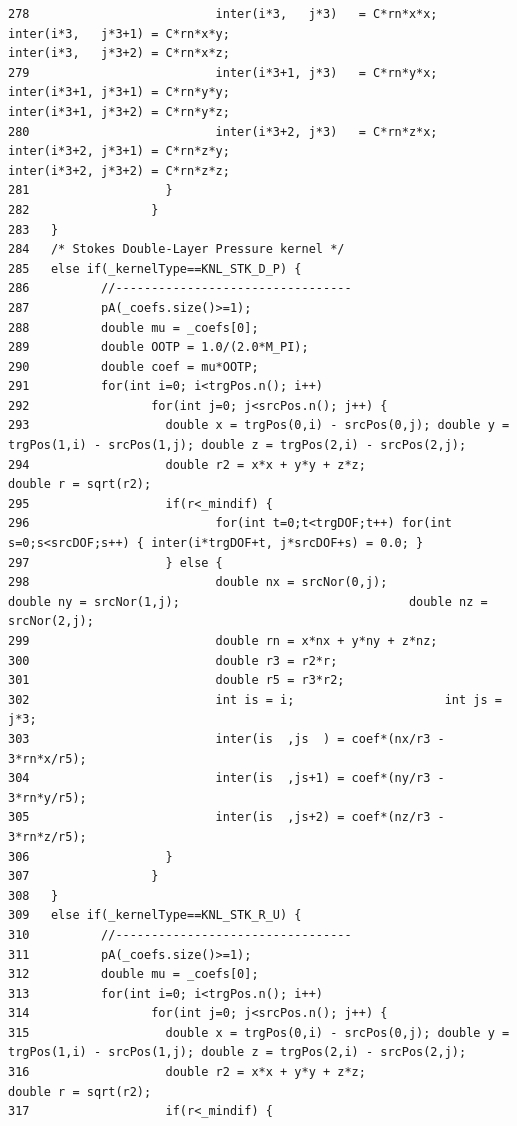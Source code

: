\begin{verbatim}
278                          inter(i*3,   j*3)   = C*rn*x*x;                                  inter(i*3,   j*3+1) = C*rn*x*y;                                 inter(i*3,   j*3+2) = C*rn*x*z;
279                          inter(i*3+1, j*3)   = C*rn*y*x;                                  inter(i*3+1, j*3+1) = C*rn*y*y;                                 inter(i*3+1, j*3+2) = C*rn*y*z;
280                          inter(i*3+2, j*3)   = C*rn*z*x;                                  inter(i*3+2, j*3+1) = C*rn*z*y;                                 inter(i*3+2, j*3+2) = C*rn*z*z;
281                   }
282                 }
283   }
284   /* Stokes Double-Layer Pressure kernel */
285   else if(_kernelType==KNL_STK_D_P) {
286          //---------------------------------
287          pA(_coefs.size()>=1);
288          double mu = _coefs[0];
289          double OOTP = 1.0/(2.0*M_PI);
290          double coef = mu*OOTP;
291          for(int i=0; i<trgPos.n(); i++)
292                 for(int j=0; j<srcPos.n(); j++) {
293                   double x = trgPos(0,i) - srcPos(0,j); double y = trgPos(1,i) - srcPos(1,j); double z = trgPos(2,i) - srcPos(2,j);
294                   double r2 = x*x + y*y + z*z;                    double r = sqrt(r2);
295                   if(r<_mindif) {
296                          for(int t=0;t<trgDOF;t++) for(int s=0;s<srcDOF;s++) { inter(i*trgDOF+t, j*srcDOF+s) = 0.0; }
297                   } else {
298                          double nx = srcNor(0,j);                                 double ny = srcNor(1,j);                                double nz = srcNor(2,j);
299                          double rn = x*nx + y*ny + z*nz;
300                          double r3 = r2*r;
301                          double r5 = r3*r2;
302                          int is = i;                     int js = j*3;
303                          inter(is  ,js  ) = coef*(nx/r3 - 3*rn*x/r5);
304                          inter(is  ,js+1) = coef*(ny/r3 - 3*rn*y/r5);
305                          inter(is  ,js+2) = coef*(nz/r3 - 3*rn*z/r5);
306                   }
307                 }
308   }
309   else if(_kernelType==KNL_STK_R_U) {
310          //---------------------------------
311          pA(_coefs.size()>=1);
312          double mu = _coefs[0];
313          for(int i=0; i<trgPos.n(); i++)
314                 for(int j=0; j<srcPos.n(); j++) {
315                   double x = trgPos(0,i) - srcPos(0,j); double y = trgPos(1,i) - srcPos(1,j); double z = trgPos(2,i) - srcPos(2,j);
316                   double r2 = x*x + y*y + z*z;                    double r = sqrt(r2);
317                   if(r<_mindif) {

\end{verbatim}
